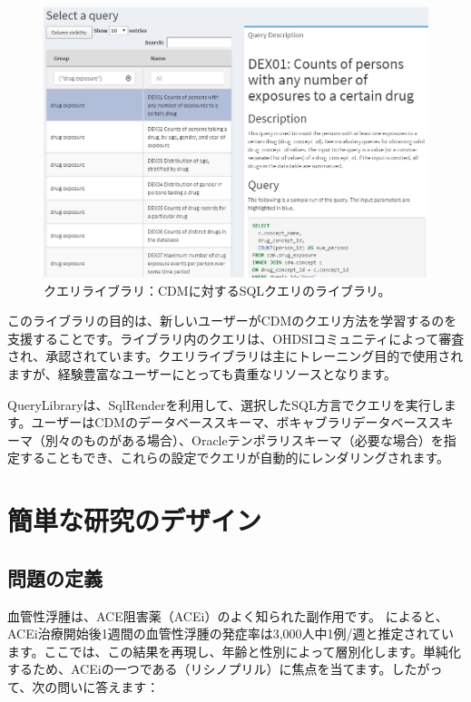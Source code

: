 \documentclass[
  11pt]{book}
\theoremstyle{definition}
\theoremstyle{definition}
\theoremstyle{definition}
\theoremstyle{definition}
\theoremstyle{remark}
\begin{document}
\begin{figure}

{\centering \includegraphics[width=1\linewidth]{images/SqlAndR/queryLibrary} 

}

\caption{クエリライブラリ：CDMに対するSQLクエリのライブラリ。}\label{fig:queryLibrary}
\end{figure}

このライブラリの目的は、新しいユーザーがCDMのクエリ方法を学習するのを支援することです。ライブラリ内のクエリは、OHDSIコミュニティによって審査され、承認されています。クエリライブラリは主にトレーニング目的で使用されますが、経験豊富なユーザーにとっても貴重なリソースとなります。

QueryLibraryは、SqlRenderを利用して、選択したSQL方言でクエリを実行します。ユーザーはCDMのデータベーススキーマ、ボキャブラリデータベーススキーマ（別々のものがある場合）、Oracleテンポラリスキーマ（必要な場合）を指定することもでき、これらの設定でクエリが自動的にレンダリングされます。

\section{簡単な研究のデザイン}\label{ux7c21ux5358ux306aux7814ux7a76ux306eux30c7ux30b6ux30a4ux30f3}

\subsection{問題の定義}\label{ux554fux984cux306eux5b9aux7fa9}

血管性浮腫は、ACE阻害薬（ACEi）のよく知られた副作用です。\citet{slater_1988} によると、ACEi治療開始後1週間の血管性浮腫の発症率は3,000人中1例/週と推定されています。ここでは、この結果を再現し、年齢と性別によって層別化します。単純化するため、ACEiの一つである（リシノプリル）に焦点を当てます。したがって、次の問いに答えます：
\end{document}
